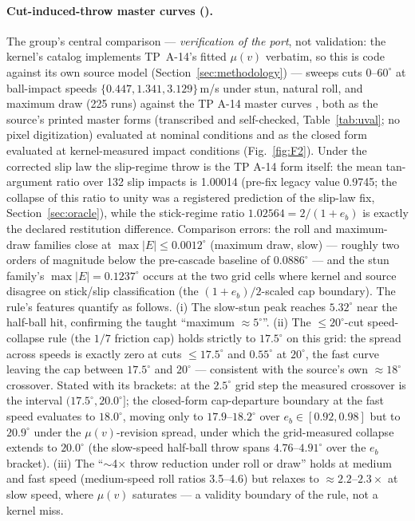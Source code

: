 \paragraph{Cut-induced-throw master curves ().}
The group's central comparison --- \emph{verification of the port}, not
validation: the kernel's catalog implements TP~A-14's fitted $\mu(v)$
verbatim, so this is code against its own source model
(Section~\ref{sec:methodology}) --- sweeps cuts $0$--$60^\circ$ at
ball-impact speeds $\{0.447, 1.341, 3.129\}$\,m/s under stun, natural
roll, and maximum draw (225 runs) against the TP A-14 master curves
\citep{alciatore_tp_a14}, both as the source's printed master forms
(transcribed and self-checked, Table~\ref{tab:uval}; no pixel
digitization) evaluated at nominal conditions and as the closed form
evaluated at kernel-measured impact conditions (Fig.~\ref{fig:F2}). Under the corrected slip law the
slip-regime throw is the TP A-14 form itself: the mean tan-argument ratio
over 132 slip impacts is 1.00014 (pre-fix legacy value 0.9745; the
collapse of this ratio to unity was a registered prediction of the
slip-law fix, Section~\ref{sec:oracle}), while the stick-regime ratio
$1.02564 = 2/(1+e_b)$ is exactly the declared restitution difference.
Comparison errors: the roll and maximum-draw families close at
$\max|E| \le 0.0012^\circ$ (maximum draw, slow) --- roughly two orders of
magnitude below the pre-cascade baseline of $0.0886^\circ$ --- and the
stun family's $\max|E| = 0.1237^\circ$ occurs at the two grid cells where
kernel and source disagree on stick/slip classification (the
$(1+e_b)/2$-scaled cap boundary). The rule's features quantify as
follows. (i) The slow-stun peak reaches $5.32^\circ$ near the half-ball
hit, confirming the taught ``maximum $\approx 5^\circ$''. (ii) The
$\le 20^\circ$-cut speed-collapse rule (the $1/7$ friction cap) holds
strictly to $17.5^\circ$ on this grid: the spread across speeds is
exactly zero at cuts $\le 17.5^\circ$ and $0.55^\circ$ at $20^\circ$,
the fast curve leaving the cap between $17.5^\circ$ and $20^\circ$ ---
consistent with the source's own $\approx 18^\circ$ crossover. Stated
with its brackets: at the $2.5^\circ$ grid step the measured crossover
is the interval $(17.5^\circ, 20.0^\circ]$; the closed-form
cap-departure boundary at the fast speed evaluates to $18.0^\circ$,
moving only to $17.9$--$18.2^\circ$ over $e_b \in [0.92, 0.98]$ but to
$20.9^\circ$ under the $\mu(v)$-revision spread, under which the
grid-measured collapse extends to $20.0^\circ$ (the slow-speed half-ball
throw spans $4.76$--$4.91^\circ$ over the $e_b$ bracket). (iii) The
``$\sim$4$\times$ throw reduction under roll or draw'' holds at medium
and fast speed (medium-speed roll ratios 3.5--4.6) but relaxes to
$\approx 2.2$--$2.3\times$ at slow speed, where $\mu(v)$ saturates --- a
validity boundary of the rule, not a kernel miss.

